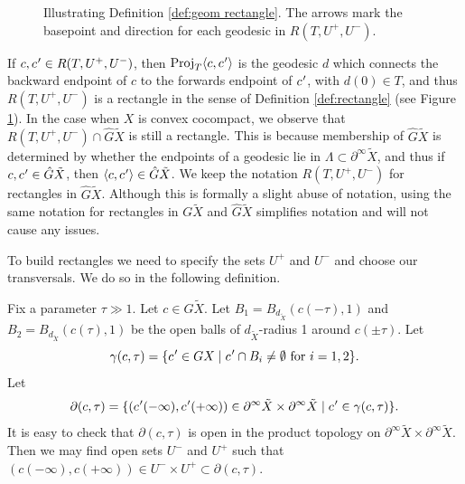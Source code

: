 \documentclass[10pt]{amsart}
\let\sep\mid
\newcommand{\cpr}{c\mkern1mu'}
\theoremstyle{definition}
\numberwithin{equation}{section}
\DeclareMathOperator{\Proj}{Proj}
\begin{document}
\begin{figure}[htb]
\caption{Illustrating Definition \ref{def:geom rectangle}. The arrows mark the basepoint and direction for each geodesic in $R(T,U^+,U^-)$.}\label{fig:geom rectangle}
\end{figure}
If $c, \cpr \in R(T,U^+,U^-)$, then $\Proj_T \langle c, \cpr\rangle $ is the geodesic $d$ which connects the backward endpoint of $c$ to the forwards endpoint of $\cpr$, with $d(0)\in T$, and thus $R(T,U^+,U^-)$ is a rectangle in the sense of Definition \ref{def:rectangle} (see Figure \ref{fig:geom rectangle}). In the case when $X$ is convex cocompact, we observe that $R(T, U^+, U^-)\cap \hat G\tilde X$ is still a rectangle. This is because membership of $\hat G\tilde X$ is determined by whether the endpoints of a geodesic lie in $\Lambda \subset \partial^\infty\tilde X$, and thus if $c, \cpr\in \hat G\tilde X$, then $\langle c,\cpr\rangle \in \hat G\tilde X$. We keep the notation $R(T, U^+, U^-)$ for rectangles in $\hat G \tilde X$. Although this is formally a slight abuse of notation, using the same notation for rectangles in $G \tilde X$ and $\hat G \tilde X$ simplifies notation and will not cause any issues.

To build rectangles we need to specify the sets $U^+$ and $U^-$ and choose our transversals. We do so in the following definition.

Fix a parameter $\tau \gg 1$. Let $c\in G\tilde X$. Let $B_1 = B_{d_{\tilde X}}(c(-\tau),1)$ and $B_2 = B_{d_{\tilde X}}(c(\tau),1)$ be the open balls of $d_{\tilde X}$-radius 1 around $c(\pm\tau)$. Let
\[ \gamma(c, \tau) = \{ \cpr\in GX \sep \cpr \cap B_i \neq \emptyset \mbox{ for } i=1,2 \}. \]
Let
\[ \partial (c, \tau) = \{ (\cpr(-\infty), \cpr(+\infty)) \in \partial^\infty \tilde X \times \partial^\infty \tilde X \sep \cpr\in \gamma(c,\tau) \}.\]
It is easy to check that $\partial (c, \tau)$ is open in the product topology on $\partial^\infty \tilde X \times \partial^\infty \tilde X$. Then we may find open sets $U^-$ and $U^+$ such that $(c(-\infty), c(+\infty)) \in U^- \times U^+ \subset \partial (c, \tau)$.
\end{document}
